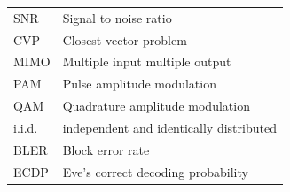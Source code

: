 \documentclass[english,12pt,a4paper,pdftex,sci,utf8]{aaltothesis}
\begin{document}
\begin{tabular}{ll}
SNR & Signal to noise ratio \\
CVP & Closest vector problem \\
MIMO & Multiple input multiple output \\
PAM & Pulse amplitude modulation \\
QAM & Quadrature amplitude modulation \\
i.i.d. & independent and identically distributed \\
BLER & Block error rate \\
ECDP & Eve's correct decoding probability \\
\end{tabular}


\cleardoublepage
\storeinipagenumber
{}
\setcounter{page}{1}


\end{document}
